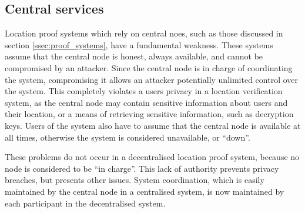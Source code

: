 \subsection{Central services} \label{ssec:centralised}
Location proof systems which rely on central noes, such as those discussed in section \ref{ssec:proof_systems}, have a fundamental weakness. These systems assume that the central node is honest, always available, and cannot be compromised by an attacker. Since the central node is in charge of coordinating the system, compromising it allows an attacker potentially unlimited control over the system. This completely violates a users privacy in a location verification system, as the central node may contain sensitive information about users and their location, or a means of retrieving sensitive information, such as decryption keys. Users of the system also have to assume that the central node is available at all times, otherwise the system is considered unavailable, or ``down''.

These problems do not occur in a decentralised location proof system, because no node is considered to be ``in charge''. This lack of authority prevents privacy breaches, but presents other issues. System coordination, which is easily maintained by the central node in a centralised system, is now maintained by each participant in the decentralised system.

